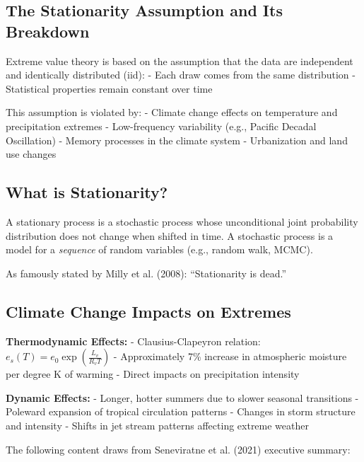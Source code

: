 \documentclass[
  letterpaper,
  DIV=11,
  numbers=noendperiod]{scrreprt}
\begin{document}
\subsection{The Stationarity Assumption and Its
Breakdown}\label{the-stationarity-assumption-and-its-breakdown}

Extreme value theory is based on the assumption that the data are
independent and identically distributed (iid): - Each draw comes from
the same distribution - Statistical properties remain constant over time

This assumption is violated by: - Climate change effects on temperature
and precipitation extremes - Low-frequency variability (e.g., Pacific
Decadal Oscillation) - Memory processes in the climate system -
Urbanization and land use changes

\subsection{What is Stationarity?}\label{what-is-stationarity}

A stationary process is a stochastic process whose unconditional joint
probability distribution does not change when shifted in time. A
stochastic process is a model for a \emph{sequence} of random variables
(e.g., random walk, MCMC).

As famously stated by Milly et al. (2008): ``Stationarity is dead.''

\subsection{Climate Change Impacts on
Extremes}\label{climate-change-impacts-on-extremes}

\textbf{Thermodynamic Effects:} - Clausius-Clapeyron relation:
\(e_s(T) = e_0 \exp\left(\frac{L_v}{R_v T}\right)\) - Approximately 7\%
increase in atmospheric moisture per degree K of warming - Direct
impacts on precipitation intensity

\textbf{Dynamic Effects:} - Longer, hotter summers due to slower
seasonal transitions - Poleward expansion of tropical circulation
patterns - Changes in storm structure and intensity - Shifts in jet
stream patterns affecting extreme weather

The following content draws from Seneviratne et al. (2021) executive
summary:
\end{document}
